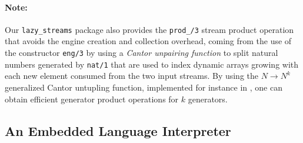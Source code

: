 \documentclass[submission,copyright,creativecommons]{eptcs}
\begin{document}
\paragraph{Note:} Our {\tt lazy\_streams} package also provides the {\tt prod\_/3} stream product 
operation that avoids the engine creation and collection overhead,
coming from the use of the constructor {\tt eng/3} by using a \emph{Cantor
unpairing function} to split natural numbers generated by {\tt nat/1}
that are used to index dynamic arrays growing with each new element consumed
from the two input streams. By using the  $N \rightarrow N^k$ generalized Cantor
untupling function, implemented for instance in \cite{serpro}, one can obtain efficient
generator product operations for $k$ generators.


\subsection{An Embedded Language Interpreter}
\end{document}
